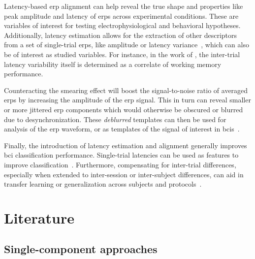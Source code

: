 \begin{enumerate*}[label={(\arabic*)}]
	\item Latency-based \ac{erp} alignment can help reveal the true shape and
	properties like peak amplitude and latency of \acp{erp} across
	experimental conditions. These are variables of interest for
	testing electrophysiological and behavioral hypotheses.
	Additionally, latency estimation allows for the extraction of
	other descriptors from a set of single-trial \acp{erp}, like
	amplitude or latency variance~\cite{Hultsch2004}, which can
	also be of interest as studied variables.
  For instance, in the work of \textcite{Saville2014}, the inter-trial latency
  variability itself is determined as a correlate of working memory performance.
	\item Counteracting the smearing effect will boost the signal-to-noise
	ratio of averaged \acp{erp} by increasing the amplitude of the
	\ac{erp} signal. This in turn can reveal smaller or more jittered \ac{erp}
  components which would otherwise be obscured or blurred due to desynchronization.
    These \emph{deblurred} templates can then be used for analysis of the \ac{erp}
	waveform, or as templates of the signal of interest in
	\acp{bci}~\cite{Arico2014}.
	\item Finally, the introduction of latency estimation and alignment generally
	improves \ac{bci} classification performance.
  Single-trial latencies can be used as features to improve
  classification~\cite{Hardiansyah2020}.
	Furthermore, compensating for inter-trial differences, especially when
	extended to inter-session or inter-subject differences, can aid in transfer learning or
	generalization across subjects and protocols~\cite{Iturrate2014}.
\end{enumerate*}


\section{Literature}

\subsection{Single-component approaches}
\label{sec:wcble/literature/single-comp}

